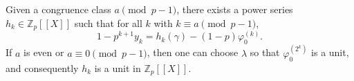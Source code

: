 Given a congruence class $a \pmod{p-1}$, there exists a power series $h_k \in \mathbb{Z}_p[[X]]$ such that for all $k$ with $k \equiv a \pmod{p-1}$,
$$1 - p^{k+1} y_k = h_k(\gamma) - (1 - p) \varphi_0^{(k)}.$$
If $a$ is even or $a \equiv 0 \pmod{p-1}$, then one can choose $\lambda$ so that $\varphi_0^{(2^k)}$ is a unit, and consequently $h_k$ is a unit in $\mathbb{Z}_p[[X]]$.
